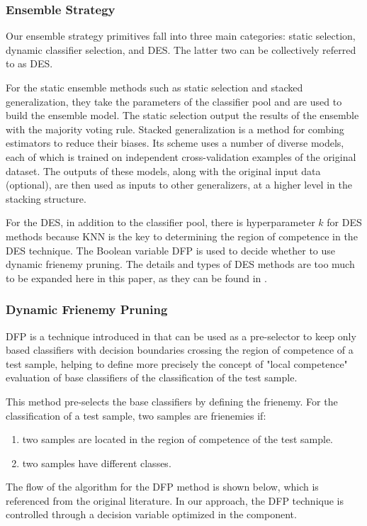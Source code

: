 \documentclass[review]{elsarticle}
\begin{document}
\subsubsection{Ensemble Strategy}
Our ensemble strategy primitives fall into three main categories: static selection, dynamic classifier selection, and DES. The latter two can be collectively referred to as DES. 

For the static ensemble methods such as static selection and stacked generalization, they take the parameters of the classifier pool and are used to build the ensemble model. The static selection output the results of the ensemble with the majority voting rule. Stacked generalization is a method for combing estimators to reduce their biases. Its scheme uses a number of diverse models, each of which is trained on independent cross-validation examples of the original dataset. The outputs of these models, along with the original input data (optional), are then used as inputs to other generalizers, at a higher level in the stacking structure.

For the DES, in addition to the classifier pool, there is hyperparameter $k$ for DES methods because KNN is the key to determining the region of competence in the DES technique. The Boolean variable DFP is used to decide whether to use dynamic frienemy pruning. The details and types of DES methods are too much to be expanded here in this paper, as they can be found in \cite{britto2014dynamic}\cite{cruz2018dynamic}.
\subsubsection{Dynamic Frienemy Pruning}
DFP is a technique introduced in \cite{oliveira2017online} that can be used as a pre-selector to keep only based classifiers with decision boundaries crossing the region of competence of a test sample, helping to define more precisely the concept of "local competence" evaluation of base classifiers of the classification of the test sample. 

This method pre-selects the base classifiers by defining the frienemy. For the classification of a test sample, two samples are frienemies if:
\begin{enumerate}[(1)]
	\item two samples are located in the region of competence of the test sample.
	\item two samples have different classes. 
\end{enumerate}	
The flow of the algorithm for the DFP method is shown below, which is referenced from the original literature. In our approach, the DFP technique is controlled through a decision variable optimized in the component.
\end{document}
